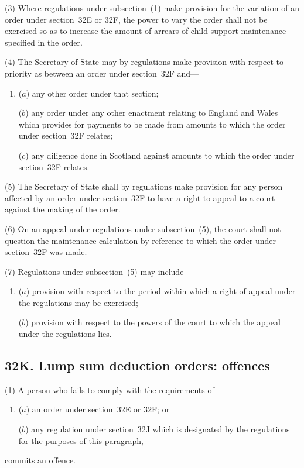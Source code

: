 \documentclass[12pt,a4paper]{article}
\begin{document}
(3)
Where regulations under subsection~(1) make provision for the variation of an order under section~32E or 32F, the power to vary the order shall not be exercised so as to increase the amount of arrears of child support maintenance specified in the order.

(4)
The Secretary of State may by regulations make provision with respect to priority as between an order under section~32F and---
\begin{enumerate}\item[]
($a$) any other order under that section;

($b$) any order under any other enactment relating to England and Wales which provides for payments to be made from amounts to which the order under section~32F relates;

($c$) any diligence done in Scotland against amounts to which the order under section~32F relates.
\end{enumerate}

(5)
The Secretary of State shall by regulations make provision for any person affected by an order under section~32F to have a right to appeal to a court against the making of the order.

(6)
On an appeal under regulations under subsection~(5), the court shall not question the maintenance calculation by reference to which the order under section~32F was made.

(7)
Regulations under subsection~(5) may include---
\begin{enumerate}\item[]
($a$) provision with respect to the period within which a right of appeal under the regulations may be exercised;

($b$) provision with respect to the powers of the court to which the appeal under the regulations lies.
\end{enumerate}

\subsection{32K. Lump sum deduction orders: offences}

(1) A person who fails to comply with the requirements of---
\begin{enumerate}\item[]
($a$) an order under section~32E or 32F; or

($b$) any regulation under section~32J which is designated by the regulations for the purposes of this paragraph,
\end{enumerate}
commits an offence.
\end{document}
